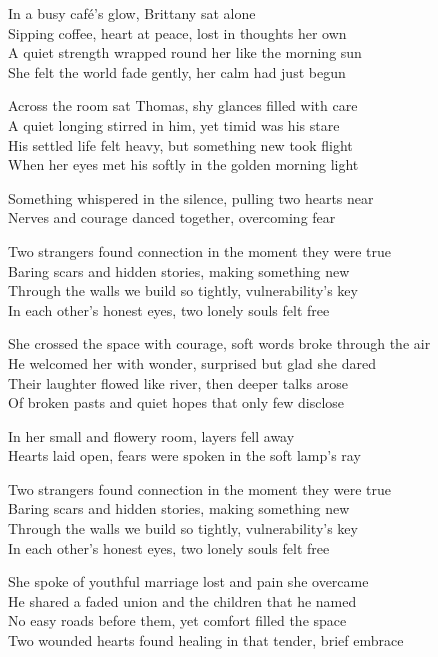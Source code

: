 \begin{lyrics}

In a busy café’s glow, Brittany sat alone\\
Sipping coffee, heart at peace, lost in thoughts her own\\
A quiet strength wrapped round her like the morning sun\\
She felt the world fade gently, her calm had just begun

Across the room sat Thomas, shy glances filled with care\\
A quiet longing stirred in him, yet timid was his stare\\
His settled life felt heavy, but something new took flight\\
When her eyes met his softly in the golden morning light

Something whispered in the silence, pulling two hearts near\\
Nerves and courage danced together, overcoming fear

Two strangers found connection in the moment they were true\\
Baring scars and hidden stories, making something new\\
Through the walls we build so tightly, vulnerability’s key\\
In each other’s honest eyes, two lonely souls felt free

She crossed the space with courage, soft words broke through the air\\
He welcomed her with wonder, surprised but glad she dared\\
Their laughter flowed like river, then deeper talks arose\\
Of broken pasts and quiet hopes that only few disclose

In her small and flowery room, layers fell away\\
Hearts laid open, fears were spoken in the soft lamp’s ray

Two strangers found connection in the moment they were true\\
Baring scars and hidden stories, making something new\\
Through the walls we build so tightly, vulnerability’s key\\
In each other’s honest eyes, two lonely souls felt free

She spoke of youthful marriage lost and pain she overcame\\
He shared a faded union and the children that he named\\
No easy roads before them, yet comfort filled the space\\
Two wounded hearts found healing in that tender, brief embrace


\end{lyrics}
